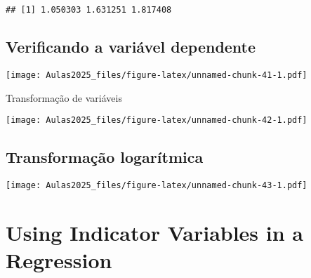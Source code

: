 \documentclass[
]{book}
\newenvironment{Shaded}{\begin{snugshade}}{\end{snugshade}}
\newcommand{\FunctionTok}[1]{\textcolor[rgb]{0.13,0.29,0.53}{\textbf{#1}}}
\newcommand{\NormalTok}[1]{#1}
\newcommand{\SpecialCharTok}[1]{\textcolor[rgb]{0.81,0.36,0.00}{\textbf{#1}}}
\begin{document}
\begin{verbatim}
## [1] 1.050303 1.631251 1.817408
\end{verbatim}

\hypertarget{verificando-a-variuxe1vel-dependente}{%
\subsection{Verificando a variável
dependente}\label{verificando-a-variuxe1vel-dependente}}

\begin{Shaded}
\end{Shaded}

\texttt{[image: Aulas2025\_files/figure-latex/unnamed-chunk-41-1.pdf]}

Transformação de variáveis

\begin{Shaded}
\end{Shaded}

\texttt{[image: Aulas2025\_files/figure-latex/unnamed-chunk-42-1.pdf]}

\hypertarget{transformauxe7uxe3o-logaruxedtmica}{%
\subsection{Transformação
logarítmica}\label{transformauxe7uxe3o-logaruxedtmica}}

\begin{Shaded}
\end{Shaded}

\texttt{[image: Aulas2025\_files/figure-latex/unnamed-chunk-43-1.pdf]}

\hypertarget{using-indicator-variables-in-a-regression}{%
\section{Using Indicator Variables in a
Regression}\label{using-indicator-variables-in-a-regression}}
\end{document}
